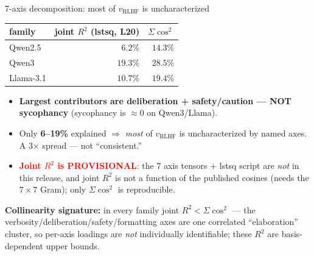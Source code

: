 \documentclass[aspectratio=169,11pt]{beamer}
\begin{document}
\begin{frame}{7-axis decomposition: most of $v_{\mathrm{RLHF}}$ is uncharacterized}
  \begin{table}
    \centering
    \footnotesize
    \begin{tabular}{@{}lrr@{}}
      \toprule
      family & joint $R^2$ (lstsq, L20) & $\Sigma\cos^2$ \\
      \midrule
      Qwen2.5   & $6.2\%$  & $14.3\%$ \\
      Qwen3     & $19.3\%$ & $28.5\%$ \\
      Llama-3.1 & $10.7\%$ & $19.4\%$ \\
      \bottomrule
    \end{tabular}
  \end{table}
  \vspace{0.2em}
  \begin{itemize}
    \footnotesize
    \item \textbf{Largest contributors are deliberation + safety/caution --- NOT
      sycophancy} (sycophancy is $\approx 0$ on Qwen3/Llama).
    \item Only \textbf{6--19\%} explained $\Rightarrow$ \emph{most} of $v_{\mathrm{RLHF}}$
      is uncharacterized by named axes. A 3$\times$ spread --- not ``consistent.''
    \item \textcolor{red}{\textbf{Joint $R^2$ is PROVISIONAL}}: the 7 axis tensors +
      lstsq script are \emph{not} in this release, and joint $R^2$ is not a function of
      the published cosines (needs the $7\!\times\!7$ Gram); only $\Sigma\cos^2$ is reproducible.
  \end{itemize}
  \scriptsize
  \textbf{Collinearity signature:} in every family joint $R^2 < \Sigma\cos^2$ --- the
  verbosity/deliberation/safety/formatting axes are one correlated ``elaboration'' cluster, so
  per-axis loadings are \emph{not} individually identifiable; these $R^2$ are basis-dependent upper bounds.
\end{frame}
\end{document}
